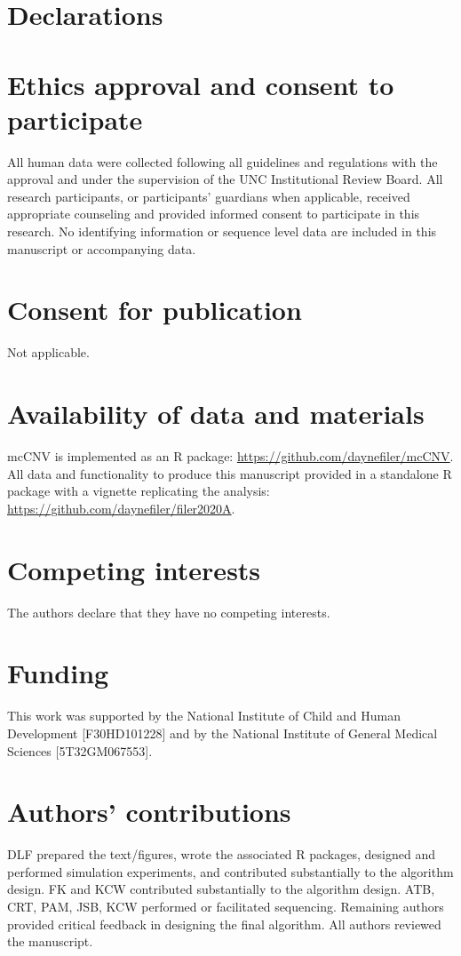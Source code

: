 \documentclass{bmcart}\usepackage[]{graphicx}\usepackage[]{color}
\begin{document}
\section*{Declarations}

\begin{backmatter}

\section*{Ethics approval and consent to participate}%
All human data were collected following all guidelines and regulations with the approval and under the supervision of the UNC Institutional Review Board.
All research participants, or participants' guardians when applicable, received appropriate counseling and provided informed consent to participate in this research.
No identifying information or sequence level data are included in this manuscript or accompanying data.

\section*{Consent for publication}
Not applicable.

\section*{Availability of data and materials}%
mcCNV is implemented as an R package: \url{https://github.com/daynefiler/mcCNV}. All data and functionality to produce this manuscript provided in a standalone R package with a vignette replicating the analysis: \url{https://github.com/daynefiler/filer2020A}.

\section*{Competing interests}
The authors declare that they have no competing interests.

\section*{Funding}%
This work was supported by the National Institute of Child and Human Development [F30HD101228] and by the National Institute of General Medical Sciences [5T32GM067553].

\section*{Authors' contributions}
DLF prepared the text/figures, wrote the associated R packages, designed and performed simulation experiments, and contributed substantially to the algorithm design. FK and KCW contributed substantially to the algorithm design. ATB, CRT, PAM, JSB, KCW performed or facilitated sequencing. Remaining authors provided critical feedback in designing the final algorithm. All authors reviewed the manuscript.


\end{backmatter}
\end{document}
